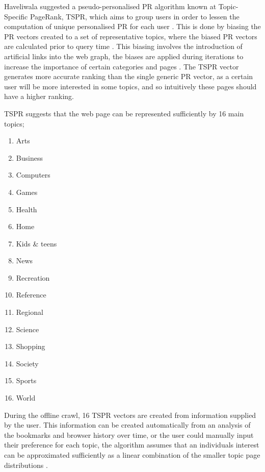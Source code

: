\documentclass[11pt]{report}
\begin{document}
{Haveliwala suggested a pseudo-personalised PR algorithm known at Topic-Specific PageRank, TSPR, which aims to group users in order to lessen the computation of unique personalised PR for each user \cite{haveliwala2002topic}. This is done by biasing the PR vectors created to a set of representative topics, where the biased PR vectors are calculated prior to query time \cite{haveliwala2002topic, langville}. This biasing involves the introduction of artificial links into the web graph, the biases are applied during iterations to increase the importance of certain categories and pages \cite{haveliwala1999efficient}. The TSPR vector generates more accurate ranking than the single generic PR vector, as a certain user will be more interested in some topics, and so intuitively these pages should have a higher ranking. 


TSPR suggests that the web page can be represented sufficiently by 16 main topics;
\begin{enumerate}
\item Arts
\item Business
\item Computers
\item Games
\item Health
\item Home
\item Kids \& teens
\item News
\item Recreation
\item Reference
\item Regional
\item Science
\item Shopping
\item Society
\item Sports
\item World
\end{enumerate} During the offline crawl, 16 TSPR vectors are created from information supplied by the user. This information can be created automatically from an analysis of the bookmarks and browser history over time, or the user could manually input their preference for each topic, the algorithm assumes that an individuals interest can be approximated sufficiently as a linear combination of the smaller topic page distributions \cite{manning}.

}
\end{document}

